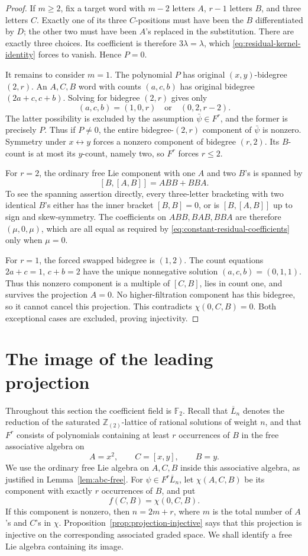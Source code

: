 \documentclass[11pt]{article}
\newcommand{\Z}{\mathbb Z}
\newcommand{\F}{{\mathbb F_2}}
\theoremstyle{definition}
\theoremstyle{remark}
\numberwithin{equation}{section}
\begin{document}
\begin{proof}
If $m\geq2$, fix a target word with $m-2$ letters $A$, $r-1$ letters
$B$, and three letters $C$.  Exactly one of its three $C$-positions
must have been the $B$ differentiated by $D$; the other two must have
been $A$'s replaced in the substitution.  There are exactly three
choices.  Its coefficient is therefore $3\lambda=\lambda$, which
\eqref{eq:residual-kernel-identity} forces to vanish.  Hence $P=0$.

It remains to consider $m=1$.  The polynomial $P$ has original
$(x,y)$-bidegree $(2,r)$.  An $A,C,B$ word with counts $(a,c,b)$ has
original bidegree $(2a+c,c+b)$.  Solving for bidegree $(2,r)$ gives
only
\[
 (a,c,b)=(1,0,r)\quad\text{or}\quad(0,2,r-2).
\]
The latter possibility is excluded by the assumption
$\bar\psi\in F^r$, and the former is precisely $P$.  Thus if $P\ne0$,
the entire bidegree-$(2,r)$ component of $\bar\psi$ is nonzero.
Symmetry under $x\leftrightarrow y$ forces a nonzero component of
bidegree $(r,2)$.  Its $B$-count is at most its $y$-count, namely two,
so $F^r$ forces $r\leq2$.

For $r=2$, the ordinary free Lie component with one $A$ and two $B$'s
is spanned by
\[
 [B,[A,B]]=ABB+BBA.
\]
To see the spanning assertion directly, every three-letter bracketing
with two identical $B$'s either has the inner bracket $[B,B]=0$, or
is $[B,[A,B]]$ up to sign and skew-symmetry.  The coefficients on
$ABB,BAB,BBA$ are therefore $(\mu,0,\mu)$, which are all equal as
required by \eqref{eq:constant-residual-coefficients} only when
$\mu=0$.

For $r=1$, the forced swapped bidegree is $(1,2)$.  The count equations
$2a+c=1$, $c+b=2$ have the unique nonnegative solution
$(a,c,b)=(0,1,1)$.  Thus this nonzero component is a multiple of
$[C,B]$, lies in count one, and survives the projection $A=0$.
No higher-filtration component has this bidegree, so it cannot cancel
this projection.  This contradicts $\chi(0,C,B)=0$.  Both exceptional
cases are excluded, proving injectivity.
\end{proof}

\section{The image of the leading projection}
\label{sec:image}

Throughout this section the coefficient field is $\F$.
Recall that $\overline L_n$ denotes the reduction of the saturated
$\Z_{(2)}$-lattice of rational solutions of weight $n$, and that
$F^r$ consists of polynomials containing at least $r$ occurrences of $B$
in the free associative algebra on
\[
 A=x^2,\qquad C=[x,y],\qquad B=y.
\]
We use the ordinary free Lie algebra on $A,C,B$ inside this associative
algebra, as justified in Lemma~\ref{lem:abc-free}.
For $\psi\in F^r\overline L_n$, let $\chi(A,C,B)$ be its component
with exactly $r$ occurrences of $B$, and put
\[
 f(C,B)=\chi(0,C,B).
\]
If this component is nonzero, then $n=2m+r$, where $m$ is the total
number of $A$'s and $C$'s in $\chi$.
Proposition~\ref{prop:projection-injective} says that this projection
is injective on the corresponding associated graded space.
We shall identify a free Lie algebra containing its image.
\end{document}

